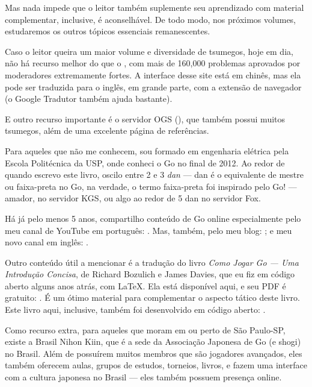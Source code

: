 Mas nada impede que o leitor também suplemente seu aprendizado com material complementar, inclusive, é aconselhável. De todo modo, nos próximos volumes, estudaremos os outros tópicos essenciais remanescentes.

Caso o leitor queira um maior volume e diversidade de tsumegos, hoje em dia, não há recurso melhor do que o , com mais de 160,000 problemas aprovados por moderadores extremamente fortes. A interface desse site está em chinês, mas ela pode ser traduzida para o inglês, em grande parte, com a extensão de navegador  (o Google Tradutor também ajuda bastante).

E outro recurso importante é o servidor OGS (), que também possui muitos tsumegos, além de uma excelente página de referências.

\bigskip
\bigskip

Para aqueles que não me conhecem, sou formado em engenharia elétrica pela Escola Politécnica da USP, onde conheci o Go no final de 2012. Ao redor de quando escrevo este livro, oscilo entre 2 e 3 \emph{dan} --- dan é o equivalente de mestre ou faixa-preta no Go, na verdade, o termo faixa-preta foi inspirado pelo Go! --- amador, no servidor KGS, ou algo ao redor de 5 dan no servidor Fox.

Há já pelo menos 5 anos, compartilho conteúdo de Go online especialmente pelo meu canal de YouTube em português: . Mas, também, pelo meu blog: ; e meu novo canal em inglês: .

Outro conteúdo útil a mencionar é a tradução do livro \emph{Como Jogar Go --- Uma Introdução Concisa}, de Richard Bozulich e James Davies, que eu fiz em código aberto alguns anos atrás, com \LaTeX. Ela está disponível aqui, e seu PDF é gratuito: . É um ótimo material para complementar o aspecto tático deste livro. Este livro aqui, inclusive, também foi desenvolvido em código aberto: .

Como recurso extra, para aqueles que moram em ou perto de São Paulo-SP, existe a Brasil Nihon Kiin, que é a sede da Associação Japonesa de Go (e shogi) no Brasil. Além de possuírem muitos membros que são jogadores avançados, eles também oferecem aulas, grupos de estudos, torneios, livros, e fazem uma interface com a cultura japonesa no Brasil --- eles também possuem presença online.

